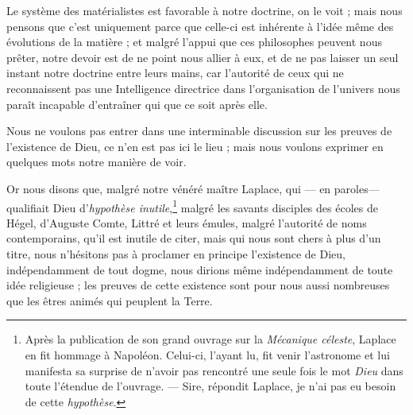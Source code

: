 \documentclass[a4paper, 11pt, oneside]{article}
\begin{document}
Le système des matérialistes est favorable à notre doctrine, on le voit ; mais nous pensons que c'est uniquement parce que celle-ci est inhérente à l'idée même des évolutions de la matière ; et malgré l'appui que ces philosophes peuvent nous prêter, notre devoir est de ne point nous allier à eux, et de ne pas laisser un seul instant notre doctrine entre leurs mains, car l'autorité de ceux qui ne reconnaissent pas une Intelligence directrice dans l'organisation de l'univers nous paraît incapable d'entraîner qui que ce soit après elle.

Nous ne voulons pas entrer dans une interminable discussion sur les preuves de l'existence de Dieu, ce n'en est pas ici le lieu ; mais nous voulons exprimer en quelques mots notre manière de voir.

Or nous disons que, malgré notre vénéré maître Laplace, qui --- en paroles--- qualifiait Dieu d'\emph{hypothèse inutile},\footnote{Après la publication de son grand ouvrage sur la \emph{Mécanique céleste}, Laplace en fit hommage à Napoléon. Celui-ci, l'ayant lu, fit venir l'astronome et lui manifesta sa surprise de n'avoir pas rencontré une seule fois le mot \emph{Dieu} dans toute l'étendue de l'ouvrage. --- Sire, répondit Laplace, je n'ai pas eu besoin de cette \emph{hypothèse}.} malgré les savants disciples des écoles de Hégel, d'Auguste Comte, Littré et leurs émules, malgré l'autorité de noms contemporains, qu'il est inutile de citer, mais qui nous sont chers à plus d'un titre, nous n'hésitons pas à proclamer en principe l'existence de Dieu, indépendamment de tout dogme, nous dirions même indépendamment de toute idée religieuse ; les preuves de cette existence sont pour nous aussi nombreuses que les êtres animés qui peuplent la Terre.
\end{document}
